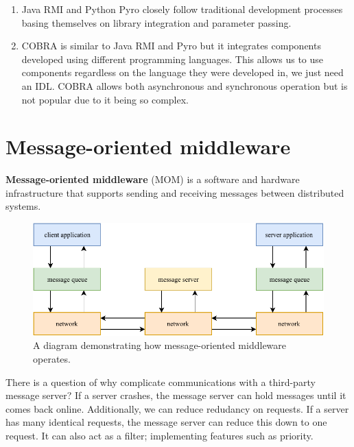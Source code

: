 
\begin{example}
    \hfill
    \begin{enumerate}
        \item 
            Java RMI and Python Pyro closely follow traditional
            development processes basing themselves on library
            integration and parameter passing.

        \item 
            COBRA is similar to Java RMI and Pyro but it integrates
            components developed using different programming
            languages.
            This allows us to use components regardless on
            the language they were developed in,
            we just need an IDL.
            COBRA allows both asynchronous and synchronous operation
            but is not popular due to it being so complex.
    \end{enumerate}
\end{example}

\section{Message-oriented middleware}

\begin{definition}
    \textbf{Message-oriented middleware} (MOM) is a software
    and hardware infrastructure that supports sending and receiving 
    messages between distributed systems.
\end{definition}

\begin{figure}[]
    \centering
    \includegraphics[width=0.8\linewidth]{images/mom.pdf}
    \caption{
        A diagram demonstrating how message-oriented middleware
        operates.
    }
    \label{fig:mom}
\end{figure}

\begin{remark}
    There is a question of why complicate communications with
    a third-party message server?
    If a server crashes, the message server can hold messages
    until it comes back online.
    Additionally,
    we can reduce redudancy on requests.
    If a server has many identical requests, the message server
    can reduce this down to one request.
    It can also act as a filter; implementing features such as priority.
\end{remark}

